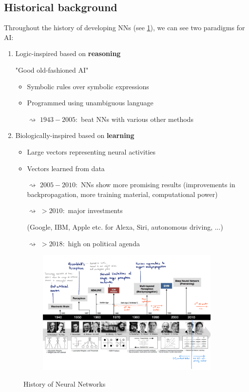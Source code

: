 \subsection{Historical background}
Throughout the history of developing NNs (see \ref{fig:6_bg_history}), we can see two paradigms for AI:
\begin{enumerate}
  \item Logic-inspired based on \textbf{reasoning} \begin{note}\footnotesize"Good old-fashioned AI"\end{note}
  \begin{itemize}
    \item Symbolic rules over symbolic expressions
    \item Programmed using unambiguous language
    \item[$\rightsquigarrow$] $1943 - 2005\!:$ beat NNs with various other methods
  \end{itemize}
  \item Biologically-inspired based on \textbf{learning}
  \begin{itemize}
    \item Large vectors representing neural activities
    \item Vectors learned from data
    \item[$\rightsquigarrow$] $2005-2010\!:$ NNs show more promising results (improvements in backpropagation, more training material, computational power)
    \item[$\rightsquigarrow$] $>\!2010\!:$ major investments \begin{note}\footnotesize(Google, IBM, Apple etc. for Alexa, Siri, autonomous driving, ...)\end{note}
    \item[$\rightsquigarrow$] $>\!2018\!:$ high on political agenda
  \end{itemize}
\end{enumerate}

\begin{figure}[H]
  \centering
  \begin{subfigure}{\textwidth}
    \includegraphics[width=\textwidth]{assets/nn/bg__history.pdf}
  \end{subfigure}
  \caption{History of Neural Networks}
  \label{fig:6_bg_history}
\end{figure}

